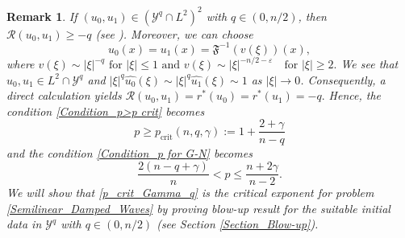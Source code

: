 \documentclass[11pt,reqno]{amsart}
\newtheorem{remark}{Remark}[section]
\begin{document}
\begin{remark} \label{Remark_Y^q}
\selectfont
If $(u_0,u_1) \in (\mathcal{Y}^{q}\cap L^2)^2$ with $q\in (0, n/2)$, then $\mathcal{R}(u_0, u_1)\geq -q$ (see \cite{ADD2026}). Moreover, we can choose
\[
u_0(x)=u_1(x)=\mathfrak{F}^{-1}(v(\xi))(x),
\]
where
$
v(\xi)\sim |\xi|^{-q} \text{ for }|\xi|\le 1 \text{ and } 
v(\xi)\sim |\xi|^{-n/2-\varepsilon}\quad\text{for }|\xi|\ge 2.
$
We see that $u_0,u_1\in L^2\cap\mathcal{Y}^{q}$ and $|\xi|^{q}\widehat{u_0}(\xi)\sim |\xi|^{q}\widehat{u_1}(\xi)\sim1$ as $|\xi|\to 0$. Consequently, a direct calculation yields
$
\mathcal{R}(u_0, u_1) = r^*(u_0)=r^*(u_1)=-q.
$
Hence, the condition \eqref{Condition_p>p crit} becomes
\begin{equation}\label{p_crit_Gamma_q}
p \geq p_{\mathrm{crit}}(n,q,\gamma):=1+\frac{2+\gamma}{n-q}
\end{equation}
and the condition \eqref{Condition_p for G-N} becomes
\begin{equation}\label{G-N_p_crit_Gamma_q}
\displaystyle\frac{2(n-q+\gamma)}{n}<p \leq \displaystyle\frac{n + 2\gamma}{n-2}.
\end{equation}
We will show that \eqref{p_crit_Gamma_q} is the critical exponent for problem \eqref{Semilinear_Damped_Waves} by proving blow-up result for the  suitable initial data in $\mathcal{Y}^{q}$ with $q\in (0, n/2)$ (see Section \ref{Section_Blow-up}).
\end{remark}
\end{document}
